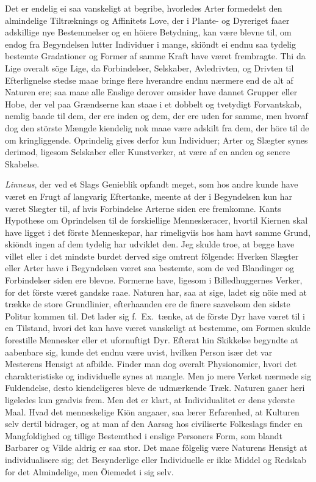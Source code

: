 \documentclass[12pt,a4paper]{article}
\newcommand{\opage}[1]{\marginnote{\footnotesize\textit{[#1]}}}
\begin{document}
Det er endelig ei saa vanskeligt at begribe, hvorledes Arter formedelst
den almindelige Tiltræknings og Affinitets Love, der i Plante- og
Dyreriget faaer adskillige nye Bestemmelser og en höiere Betydning, kan
være blevne til, om endog fra Begyndelsen lutter Individuer i mange,
skiöndt ei endnu saa tydelig bestemte Gradationer og Former af samme Kraft
have været frembragte. Thi da Lige overalt söge Lige, da Forbindelser,
Selskaber, Avledrivten, og Drivten til Efterlignelse stedse maae bringe
flere hverandre endnu nærmere end de alt af Naturen ere; saa maae alle
Enslige derover omsider have dannet Grupper eller Hobe, der vel paa
Grændserne kan staae i et dobbelt og tvetydigt Forvantskab, nemlig baade
til dem, der ere inden og dem, der ere uden for samme, men hvoraf dog den
störste Mængde kiendelig nok maae være adskilt fra dem, der höre til de om%
\opage{238}kringliggende. Oprindelig gives derfor kun Individuer; Arter og Slægter
synes derimod, ligesom Selskaber eller Kunstverker, at være af en anden og
senere Skabelse.

\emph{Linneus}, der ved et Slags Genieblik opfandt meget, som hos andre
kunde have været en Frugt af langvarig Eftertanke, meente at der i
Begyndelsen kun har været Slægter til, af hvis Forbindelse Arterne siden
ere fremkomne. Kants Hypothese om Oprindelsen til de forskiellige
Menneskeracer, hvortil Kiernen skal have ligget i det förste Menneskepar,
har rimeligviis hos ham havt samme Grund, skiöndt ingen af dem tydelig har
udviklet den. Jeg skulde troe, at begge have villet eller i det mindste
burdet derved sige omtrent fölgende: Hverken Slægter eller Arter have i
Begyndelsen været saa bestemte, som de ved Blandinger og Forbindelser
siden ere blevne. Formerne have, ligesom i Billedhuggernes Verker, for det
förste været gandske raae. Naturen har, saa at sige, ladet sig nöie med at
trække de store Grundlinier, efterhaanden ere de finere saavelsom den
sidste Politur kommen til. Det lader sig f.~Ex.\ tænke, at de förste Dyr
have været til i en Tilstand, hvori det kan have været vanskeligt at
bestemme, om Formen skulde forestille Mennesker eller et ufornuftigt Dyr.
Efterat hin Skikkelse begyndte at aabenbare sig, kunde det endnu være
uvist, hvilken Person især det var Mesterens Hensigt at afbilde. Finder man
dog overalt Physionomier, hvori det charakteristiske og individuelle synes
at mangle. Men jo mere Verket nærmede sig Fuldendelse, desto kiendeligeres
bleve de udmærkende Træk. Naturen gaaer heri ligeledes kun gradvis frem.
Men det er klart, at Individualitet er dens
\opage{239} yderste Maal. Hvad det menneskelige Kiön angaaer, saa lærer Erfarenhed, at
Kulturen selv dertil bidrager, og at man af den Aarsag hos civiliserte
Folkeslags finder en Mangfoldighed og tillige Bestemthed i enslige
Personers Form, som blandt Barbarer og Vilde aldrig er saa stor. Det maae
fölgelig være Naturens Hensigt at individualisere sig; det Besynderlige
eller Individuelle er ikke Middel og Redskab for det Almindelige, men
Öiemedet i sig selv.
\end{document}
